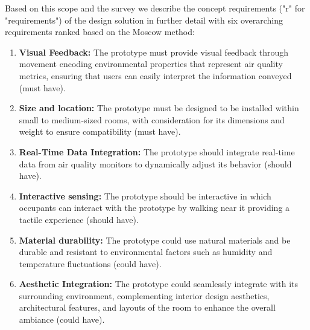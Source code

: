Based on this scope and the survey we describe the concept requirements ("r" for "requirements") of the design solution in further detail with six overarching requirements ranked based on the Moscow method:

\begin{enumerate}
    \renewcommand{\labelenumi}{R\arabic{enumi}:}
    \item \textbf{Visual Feedback:} The prototype must provide visual feedback through movement encoding environmental properties that represent air quality metrics, ensuring that users can easily interpret the information conveyed (must have).
    \item \textbf{Size and location:} The prototype must be designed to be installed within small to medium-sized rooms, with consideration for its dimensions and weight to ensure compatibility (must have).
    \item \textbf{Real-Time Data Integration:} The prototype should integrate real-time data from air quality monitors to dynamically adjust its behavior (should have).
    \item \textbf{Interactive sensing:} The prototype should be interactive in which occupants can interact with the prototype by walking near it providing a tactile experience (should have).
    \item \textbf{Material durability:} The prototype could use natural materials and be durable and resistant to environmental factors such as humidity and temperature fluctuations (could have).
    \item \textbf{Aesthetic Integration:} The prototype could seamlessly integrate with its surrounding environment, complementing interior design aesthetics, architectural features, and layouts of the room to enhance the overall ambiance (could have).
\end{enumerate}

